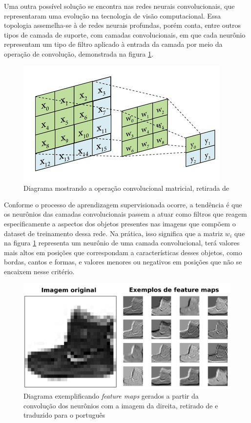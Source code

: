 \documentclass[]{politex}
\begin{document}
Uma outra possível solução se encontra nas redes neurais convolucionais, que representaram uma evolução na tecnologia de visão computacional. Essa topologia assemelha-se à de redes neurais profundas, porém conta, entre outros tipos de camada de suporte, com camadas convolucionais, em que cada neurônio representam um tipo de filtro aplicado à entrada da camada por meio da operação de convolução, demonstrada na figura \ref{fig:convolucao}.

\begin{figure}[ht]
  \centering
  \includegraphics[scale=0.7]{img/convolucao.png}
  \caption{Diagrama mostrando a operação convolucional matricial, retirada de \citeyear{convolucao} \citeauthor{convolucao}}
  \label{fig:convolucao}
\end{figure}

Conforme o processo de aprendizagem supervisionada ocorre, a tendência é que os neurônios das camadas convolucionais passem a atuar como filtros que reagem especificamente a aspectos dos objetos presentes nas imagens que compõem o dataset de treinamento dessa rede. Na prática, isso significa que a matriz $\mathit{w_{i}}$ que na figura \ref{fig:convolucao} representa um neurônio de uma camada convolucional, terá valores mais altos em posições que correspondam a características desses objetos, como bordas, cantos e formas, e valores menores ou negativos em posições que não se encaixem nesse critério.

\begin{figure}[ht]
  \centering
  \includegraphics[scale=0.15]{img/featuremaps.png}
  \caption{Diagrama exemplificando \textit{feature maps} gerados a partir da convolução dos neurônios com a imagem da direita, retirado de \citeyear{featuremaps} \citeauthor{featuremaps} e traduzido para o português}
  \label{fig:featuremaps}
\end{figure}
\end{document}
